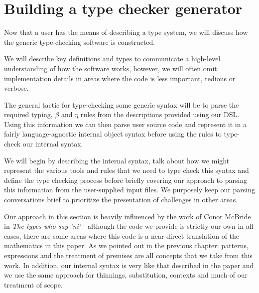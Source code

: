 \chapter{Building a type checker generator}

Now that a user has the means of describing a type system, we will
discuss how the generic type-checking software is constructed.

We will describe key definitions and types to communicate a
high-level understanding of how the software works,
however, we will often omit implementation details in areas where the
code is less important, tedious or verbose.

The general tactic for type-checking some generic syntax will be to
parse the required typing, $\beta$ and $\eta$ rules from the
descriptions provided using our DSL. Using this information we can
then parse user source code and represent it in a fairly
language-agnostic internal object syntax before using the rules
to type-check our internal syntax.

We will begin by describing the internal syntax, talk about how we
might represent the various tools and rules that we need to
type check this syntax and define the type checking process before
briefly covering our approach to parsing this information from the
user-supplied input files. We purposely keep our parsing conversations
brief to prioritize the presentation of challenges in other areas.

Our approach in this section is heavily influenced by the work of
Conor McBride in \emph{The types who say 'ni'} \cite{TypesWhoSayNi} -
although the code we provide is strictly our own in all cases, there
are some areas where this code is a near-direct translation of
the mathematics in this paper. As we pointed out in the previous
chapter: patterns, expressions and the treatment of premises are
all concepts that we take from this work. In addition, our internal
syntax is very like that described in the paper and we use the same
approach for thinnings, substitution, contexts and much of our
treatment of scope.

\\\\

















